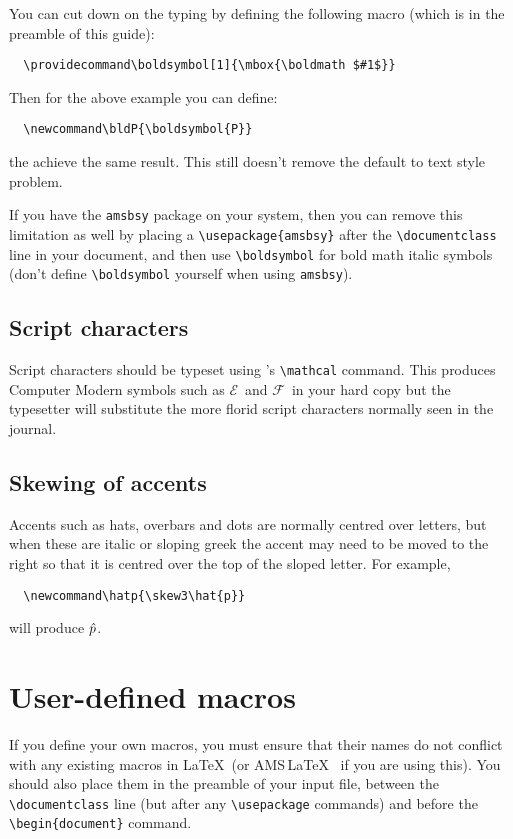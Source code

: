 \documentclass{fac}
\newcommand\hatp{\skew3\hat{p}}
\providecommand\AMSLaTeX{AMS\,\LaTeX}
\begin{document}
You can cut down on the typing by defining the following macro (which
is in the preamble of this guide):
\begin{verbatim}
  \providecommand\boldsymbol[1]{\mbox{\boldmath $#1$}}
\end{verbatim}
Then for the above example you can define:
\begin{verbatim}
  \newcommand\bldP{\boldsymbol{P}}
\end{verbatim}
the achieve the same result. This still doesn't remove the default to
text style problem.

If you have the \verb"amsbsy" package on your system, then you can remove
this limitation as well by placing a \verb"\usepackage{amsbsy}" after the
\verb"\documentclass" line in your document, and then use \verb"\boldsymbol"
for bold math italic symbols (don't define \verb"\boldsymbol" yourself when
using \verb"amsbsy").

\subsection{Script characters}

Script characters should be typeset using \LaTeXe's \verb"\mathcal"
command. This produces Computer Modern symbols such as $\mathcal{E}\,$
and $\mathcal{F}\,$ in your hard copy but the typesetter will substitute
the more florid script characters normally seen in the journal.

\subsection{Skewing of accents}

Accents such as hats, overbars and dots are normally centred over letters,
but when these are italic or sloping greek the accent may need to be moved
to the right so that it is centred over the top of the sloped letter. For
example,
%
\begin{verbatim}
  \newcommand\hatp{\skew3\hat{p}}
\end{verbatim}
will produce $\hatp$.

\section{User-defined macros}

If you define your own macros, you must ensure that their names do not
conflict with any existing macros in \LaTeX\ (or \AMSLaTeX\ %
if you are using this). You should also place them in the preamble of
your input file, between the \verb"\documentclass" line (but after any
\verb"\usepackage" commands) and before the \verb"\begin{document}" command.
\end{document}
